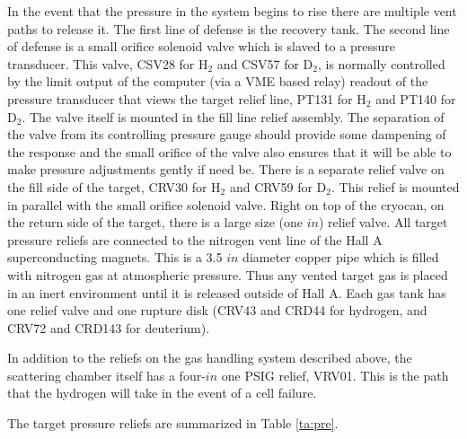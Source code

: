 {In the event that the pressure in the system begins to rise there are multiple
vent paths to release it. The first line of defense is the recovery tank.
The second line of defense is a small orifice solenoid valve
which is slaved to a pressure transducer. This valve, CSV28 for H$_2$ and
CSV57 for D$_2$, 
is normally controlled by the limit
output of the computer (via a VME based relay) readout of
the pressure transducer that views the target
relief line, PT131 for H$_2$ and PT140 for D$_2$. The valve itself is mounted
in the fill line relief assembly. The separation of the valve from its
controlling pressure gauge should provide some dampening of the response
and the small orifice of the valve also ensures that it will
be able to make pressure adjustments gently if need be.
There is 
a separate relief valve on the fill side of the target, CRV30 for H$_2$ and
CRV59 for D$_2$. This relief is mounted in parallel with the small orifice 
solenoid valve. Right on top of the cryocan, on the return side of the target,
there is a large size (one $in$) relief valve.
All target pressure reliefs are connected to the
nitrogen vent line of the Hall A superconducting magnets.
This is a 3.5 $in$ diameter 
copper pipe which is filled with nitrogen gas at atmospheric pressure.
Thus any vented target gas is placed in an inert environment until it is
released outside of Hall A. Each gas tank has one relief valve and one rupture
disk (CRV43 and CRD44 for hydrogen, and CRV72 and CRD143 for deuterium).
 
In addition to the reliefs on the gas handling system described above, the
scattering chamber itself has a four-$in$ one PSIG relief, VRV01.
This is the path that the
hydrogen will take in the event of a cell failure.   

The target pressure reliefs are summarized in Table \ref{ta:pre}.

}
